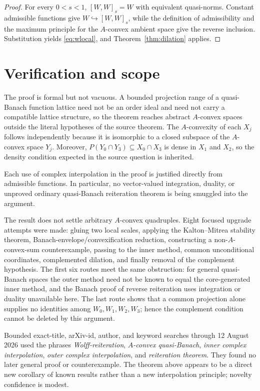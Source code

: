 \documentclass[11pt]{article}
\begin{document}
\begin{proof}
For every $0<s<1$, $[W,W]_s=W$ with equivalent quasi-norms.  Constant
admissible functions give $W\hookrightarrow[W,W]_s$, while the definition of
admissibility and the maximum principle for the $A$-convex ambient space give
the reverse inclusion.  Substitution yields \eqref{eq:wlocal}, and
Theorem~\ref{thm:dilation} applies.
\end{proof}

\section*{Verification and scope}

The proof is formal but not vacuous.  A bounded projection range of a
quasi-Banach function lattice need not be an order ideal and need not carry a
compatible lattice structure, so the theorem reaches abstract $A$-convex
spaces outside the literal hypotheses of the source theorem.  The
$A$-convexity of each $X_j$ follows independently because it is isomorphic to
a closed subspace of the $A$-convex space $Y_j$.  Moreover,
$P(Y_0\cap Y_3)\subseteq X_0\cap X_3$ is dense in $X_1$ and $X_2$, so the
density condition expected in the source question is inherited.

Each use of complex interpolation in the proof is justified directly from
admissible functions.  In particular, no vector-valued integration, duality,
or unproved ordinary quasi-Banach reiteration theorem is being smuggled into
the argument.

The result does not settle arbitrary $A$-convex quadruples.  Eight focused
upgrade attempts were made: gluing two local scales, applying the
Kalton--Mitrea stability theorem, Banach-envelope/convexification reduction,
constructing a non-$A$-convex-sum counterexample, passing to the inner method,
common unconditional coordinates, complemented dilation, and finally removal
of the complement hypothesis.  The first six routes meet the same obstruction:
for general quasi-Banach spaces the outer method need not be known to equal the
core-generated inner method, and the Banach proof of reverse reiteration uses
integration or duality unavailable here.  The last route shows that a common
projection alone supplies no identities among $W_0,W_1,W_2,W_3$; hence the
complement condition cannot be deleted by this argument.

Bounded exact-title, arXiv-id, author, and keyword searches through
12 August 2026 used the phrases \emph{Wolff-reiteration},
\emph{$A$-convex quasi-Banach}, \emph{inner complex interpolation},
\emph{outer complex interpolation}, and \emph{reiteration theorem}.  They
found no later general proof or counterexample.  The theorem above appears to
be a direct new corollary of known results rather than a new interpolation
principle; novelty confidence is modest.
\end{document}
